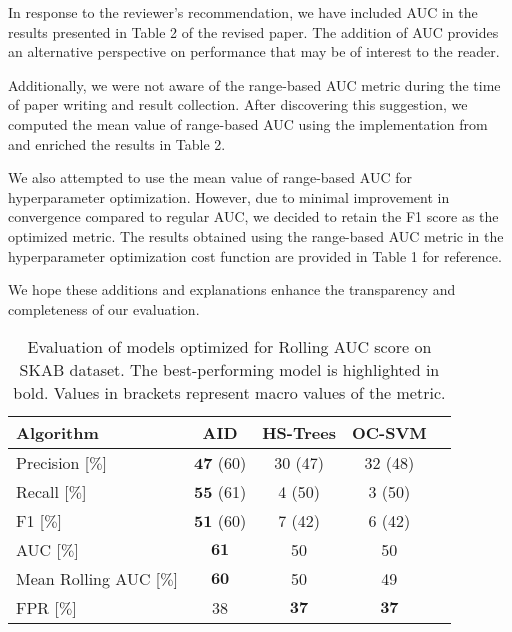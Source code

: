 \documentclass{article}
\begin{document}
\begin{enumerate}
        In response to the reviewer's recommendation, we have included AUC in the results presented in Table 2 of the revised paper. The addition of AUC provides an alternative perspective on performance that may be of interest to the reader.

        Additionally, we were not aware of the range-based AUC metric during the time of paper writing and result collection. After discovering this suggestion, we computed the mean value of range-based AUC using the implementation from~\cite{Brzezinski2017} and enriched the results in Table 2.

        We also attempted to use the mean value of range-based AUC for hyperparameter optimization. However, due to minimal improvement in convergence compared to regular AUC, we decided to retain the F1 score as the optimized metric. The results obtained using the range-based AUC metric in the hyperparameter optimization cost function are provided in Table 1 for reference.

        We hope these additions and explanations enhance the transparency and completeness of our evaluation.

\end{enumerate}


\begin{table}[htbp]
  \caption{Evaluation of models optimized for Rolling AUC score on SKAB dataset. The best-performing model is highlighted in bold. Values in brackets represent macro values of the metric.}
  \begin{center}
    \label{tab:perf_comp_f1}
    \begin{tabular}{|l|c|c|c|c|}
      \hline
      \textbf{Algorithm}      & AID                    & HS-Trees            & OC-SVM              \\
      \hline
      Precision [$\%$]        & $\boldsymbol{47}$ (60) & 30 (47)             & 32 (48)             \\
      \hline
      Recall [$\%$]           & $\boldsymbol{55}$ (61) & 4 (50)              & 3 (50)              \\
      \hline
      F1 [$\%$]               & $\boldsymbol{51}$ (60) & 7 (42)              & 6 (42)              \\
      \hline
      AUC [$\%$]              & $\boldsymbol{61}$      & 50                  & 50                  \\
      \hline
      Mean Rolling AUC [$\%$] & $\boldsymbol{60}$      & 50                  & 49                  \\
      \hline
      FPR [$\%$]              & 38      & $\boldsymbol{37}$                  & $\boldsymbol{37}$               \\
      \hline
    \end{tabular}
  \end{center}
\end{table}
\end{document}
